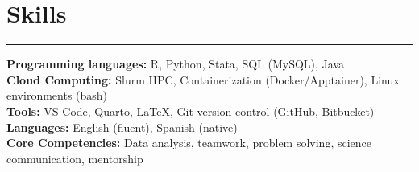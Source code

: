 \section{Skills}
\vspace{-1.5em}
\textcolor{darkgray}{\rule{\textwidth}{0.5pt}}
\textbf{Programming languages:} R, Python, Stata, SQL (MySQL), Java \\
\textbf{Cloud Computing:} Slurm HPC, Containerization (Docker/Apptainer), Linux environments (bash) \\
\textbf{Tools:} VS Code, Quarto, \LaTeX, Git version control (GitHub, Bitbucket) \\
\textbf{Languages:} English (fluent), Spanish (native) \\
\textbf{Core Competencies:} Data analysis, teamwork, problem solving, science communication, mentorship
